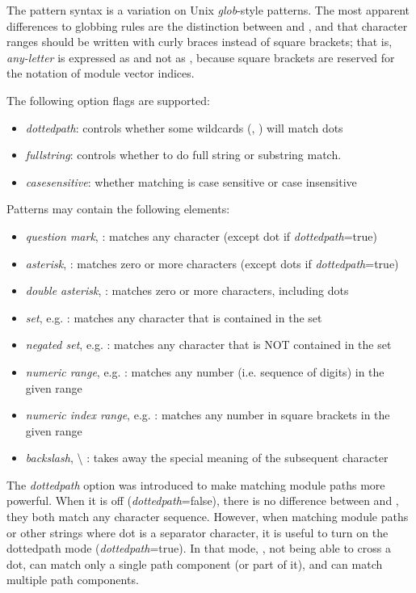 The pattern syntax is a variation on Unix \textit{glob}-style patterns. The
most apparent differences to globbing rules are the distinction between
\ttt{*} and \ttt{**}, and that character ranges should be written with
curly braces instead of square brackets; that is, \textit{any-letter} is
expressed as  and not as \ttt{[a-zA-Z]}, because square
brackets are reserved for the notation of module vector indices.

The following option flags are supported:

\begin{itemize}
  \item \textit{dottedpath}: controls whether some wildcards (, \ttt{*}) will match dots
  \item \textit{fullstring}: controls whether to do full string or substring match.
  \item \textit{casesensitive}: whether matching is case sensitive or case insensitive
\end{itemize}

Patterns may contain the following elements:

\begin{itemize}
  \item \textit{question mark},  : matches any character (except dot if \textit{dottedpath}=true)
  \item \textit{asterisk}, \ttt{*} : matches zero or more characters (except dots if \textit{dottedpath}=true)
  \item \textit{double asterisk}, \ttt{**} : matches zero or more characters, including dots
  \item \textit{set}, e.g.  : matches any character that is contained in the set
  \item \textit{negated set}, e.g. : matches any character that is NOT contained in the set
  \item \textit{numeric range}, e.g.  : matches any number (i.e. sequence of digits) in the given range
  \item \textit{numeric index range}, e.g. \ttt{[38..150]} : matches any number in square brackets in the given range
  \item \textit{backslash}, {\textbackslash} : takes away the special meaning of the subsequent character
\end{itemize}

\begin{note}
The \textit{dottedpath} option was introduced to make matching {\opp}
module paths more powerful. When it is off (\textit{dottedpath}=false),
there is no difference between \ttt{*} and \ttt{**}, they both match any
character sequence. However, when matching {\opp} module paths or other
strings where dot is a separator character, it is useful to turn on the
dottedpath mode (\textit{dottedpath}=true). In that mode, \ttt{*}, not
being able to cross a dot, can match only a single path component (or part
of it), and \ttt{**} can match multiple path components.
\end{note}

